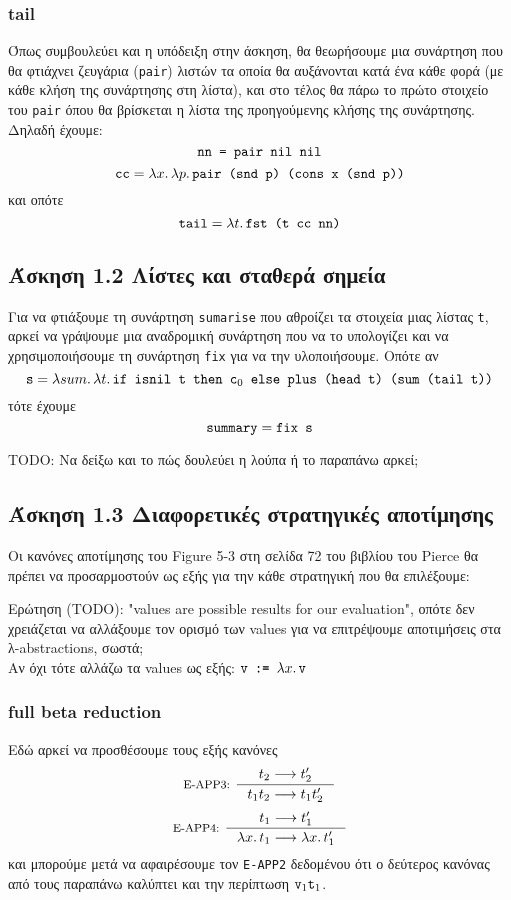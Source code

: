 \documentclass[a4paper,11pt]{article}
\newcommand\nlambda[1]{\ensuremath{\lambda #1.\,}}
\newcommand\nred{\ensuremath{\longrightarrow}}
\begin{document}
\subsubsection*{tail}
Όπως συμβουλεύει και η υπόδειξη στην άσκηση, θα θεωρήσουμε μια συνάρτηση που θα φτιάχνει ζευγάρια (\verb|pair|) λιστών τα οποία θα αυξάνονται κατά ένα κάθε φορά (με κάθε κλήση της συνάρτησης στη λίστα), και στο τέλος θα πάρω το πρώτο στοιχείο του \verb|pair| όπου θα βρίσκεται η λίστα της προηγούμενης κλήσης της συνάρτησης. Δηλαδή έχουμε:
\[\verb|nn = pair nil nil|\]
\[\verb|cc| = \nlambda{x} \nlambda{p} \verb|pair (snd p) (cons x (snd p))|\]
και οπότε
\[\verb|tail| = \nlambda{t} \verb|fst (t cc nn)|\]


\subsection*{Άσκηση 1.2 Λίστες και σταθερά σημεία}

Για να φτιάξουμε τη συνάρτηση \verb|sumarise| που αθροίζει τα στοιχεία μιας λίστας \verb|t|, αρκεί να γράψουμε μια αναδρομική συνάρτηση που να το υπολογίζει και να χρησιμοποιήσουμε τη συνάρτηση \verb|fix| για να την υλοποιήσουμε. Οπότε αν
\[\verb|s| = \nlambda{sum} \nlambda{t} \verb|if isnil t then c|_0\verb| else plus (head t) (sum (tail t))|\]
τότε έχουμε
\[\verb|summary| = \verb|fix s|\]

TODO: Να δείξω και το πώς δουλεύει η λούπα ή το παραπάνω αρκεί;


\subsection*{Άσκηση 1.3 Διαφορετικές στρατηγικές αποτίμησης}
Οι κανόνες αποτίμησης του Figure 5-3 στη σελίδα 72 του βιβλίου του Pierce θα πρέπει να προσαρμοστούν ως εξής για την κάθε στρατηγική που θα επιλέξουμε:


Ερώτηση (TODO): "values are possible results for our evaluation", οπότε δεν χρειάζεται να αλλάξουμε τον ορισμό των values για να επιτρέψουμε αποτιμήσεις στα λ-abstractions, σωστά;\\
Αν όχι τότε αλλάζω τα values ως εξής: $\verb|v := |\nlambda{x} \verb|v|$

\subsubsection*{full beta reduction}
Εδώ αρκεί να προσθέσουμε τους εξής κανόνες
\[
  \inference[E-APP3: ]{%
    t_2 \nred t'_2
  }{%
    t_1 t_2 \nred t_1 t'_2
  }
\]
\[
  \inference[E-APP4: ]{%
    t_1 \nred t'_1
  }{%
    \nlambda{x} t_1 \nred \nlambda{x} t'_1
  }
\]
και μπορούμε μετά να αφαιρέσουμε τον \verb|E-APP2| δεδομένου ότι ο δεύτερος κανόνας από τους παραπάνω καλύπτει και την περίπτωση $\verb|v|_1\verb|t|_1$.
\end{document}
